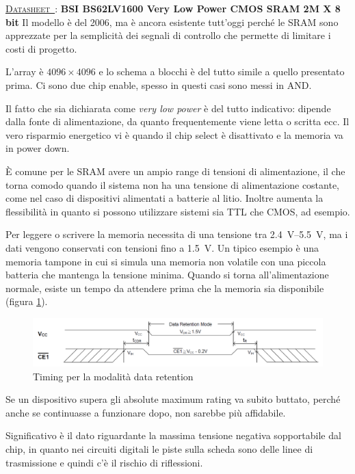 \documentclass[11pt,4paper]{report}
\newcounter{datasheetcnt}
\renewcommand{\thedatasheetcnt}{\arabic{datasheetcnt}}
\newenvironment{datasheet}[2]{\refstepcounter{datasheetcnt}\par\bigskip\medskip \label{#2}
	\noindent \underline{\textsc{Datasheet~\thedatasheetcnt}}: \textbf{#1} \newline}{\medskip}
\begin{document}
\begin{datasheet}{BSI BS62LV1600 Very Low Power CMOS SRAM 2M X 8 bit}{}
Il modello è del 2006, ma è ancora esistente tutt'oggi perché le SRAM sono apprezzate per la semplicità dei segnali di controllo che permette di limitare i costi di progetto.

L'array è $4096 \times 4096$ e lo schema a blocchi è del tutto simile a quello presentato prima. Ci sono due chip enable, spesso in questi casi sono messi in AND.

Il fatto che sia dichiarata come \emph{very low power} è del tutto indicativo: dipende dalla fonte di alimentazione, da quanto frequentemente viene letta o scritta ecc. Il vero risparmio energetico vi è quando il chip select è disattivato e la memoria va in power down.

È comune per le SRAM avere un ampio range di tensioni di alimentazione, il che torna comodo quando il sistema non ha una tensione di alimentazione costante, come nel caso di dispositivi alimentati a batterie al litio. Inoltre aumenta la flessibilità in quanto si possono utilizzare sistemi sia TTL che CMOS, ad esempio.

Per leggere o scrivere la memoria necessita di una tensione tra \SIrange{2.4}{5.5}{\volt}, ma i dati vengono conservati con tensioni fino a \SI{1.5}{\volt}. Un tipico esempio è una memoria tampone in cui si simula una memoria non volatile con una piccola batteria che mantenga la tensione minima. Quando si torna all'alimentazione normale, esiste un tempo da attendere prima che la memoria sia disponibile (figura \ref{fig:sram_data_ret}).
\begin{figure}[H]
	\centering
	\includegraphics[width=\linewidth]{memorie/sram_data_retention.png}
	\caption{Timing per la modalità data retention}
	\label{fig:sram_data_ret}
\end{figure}

Se un dispositivo supera gli absolute maximum rating va subito buttato, perché anche se continuasse a funzionare dopo, non sarebbe più affidabile. 

Significativo è il dato riguardante la massima tensione negativa sopportabile dal chip, in quanto nei circuiti digitali le piste sulla scheda sono delle linee di trasmissione e quindi c'è il rischio di riflessioni.


\end{datasheet}
\end{document}
